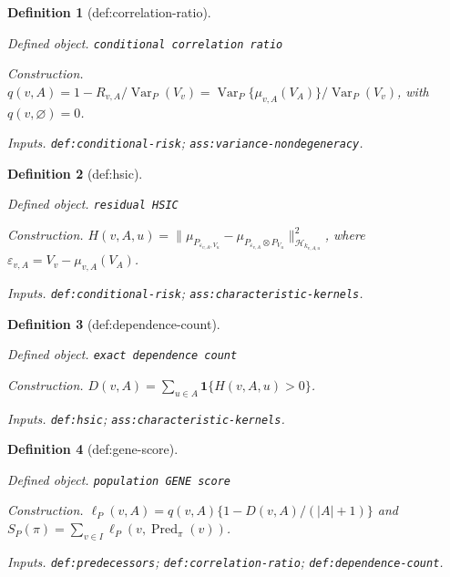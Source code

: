 \documentclass{article}
\newtheorem{definition}{Definition}
\begin{document}
\begin{definition}[def:correlation-ratio]\label{def:correlation-ratio}
\par\smallskip\noindent\emph{Defined object.} \texttt{conditional correlation ratio}
\par\smallskip\noindent\emph{Construction.} \(q(v,A)=1-R_{v,A}/\operatorname{Var}_P(V_v)=\operatorname{Var}_P\{\mu_{v,A}(V_A)\}/\operatorname{Var}_P(V_v)\), with \(q(v,\varnothing)=0\).
\par\smallskip\noindent\emph{Inputs.} \texttt{def:\allowbreak{}conditional-\allowbreak{}risk}; \texttt{ass:\allowbreak{}variance-\allowbreak{}nondegeneracy}.
\end{definition}

\begin{definition}[def:hsic]\label{def:hsic}
\par\smallskip\noindent\emph{Defined object.} \texttt{residual HSIC}
\par\smallskip\noindent\emph{Construction.} \(H(v,A,u)=\|\mu_{P_{\varepsilon_{v,A},V_u}}-\mu_{P_{\varepsilon_{v,A}}\otimes P_{V_u}}\|_{\mathcal H_{k_{v,A,u}}}^2\), where \(\varepsilon_{v,A}=V_v-\mu_{v,A}(V_A)\).
\par\smallskip\noindent\emph{Inputs.} \texttt{def:\allowbreak{}conditional-\allowbreak{}risk}; \texttt{ass:\allowbreak{}characteristic-\allowbreak{}kernels}.
\end{definition}

\begin{definition}[def:dependence-count]\label{def:dependence-count}
\par\smallskip\noindent\emph{Defined object.} \texttt{exact dependence count}
\par\smallskip\noindent\emph{Construction.} \(D(v,A)=\sum_{u\in A}\mathbf 1\{H(v,A,u)>0\}\).
\par\smallskip\noindent\emph{Inputs.} \texttt{def:\allowbreak{}hsic}; \texttt{ass:\allowbreak{}characteristic-\allowbreak{}kernels}.
\end{definition}

\begin{definition}[def:gene-score]\label{def:gene-score}
\par\smallskip\noindent\emph{Defined object.} \texttt{population GENE score}
\par\smallskip\noindent\emph{Construction.} \(\ell_P(v,A)=q(v,A)\{1-D(v,A)/(|A|+1)\}\) and \(S_P(\pi)=\sum_{v\in I}\ell_P(v,\operatorname{Pred}_{\pi}(v))\).
\par\smallskip\noindent\emph{Inputs.} \texttt{def:\allowbreak{}predecessors}; \texttt{def:\allowbreak{}correlation-\allowbreak{}ratio}; \texttt{def:\allowbreak{}dependence-\allowbreak{}count}.
\end{definition}
\end{document}
